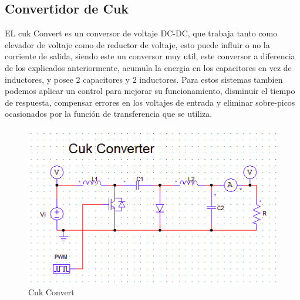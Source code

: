 \documentclass[11pt]{article}
\begin{document}
\subsection{Convertidor de Cuk}
EL cuk Convert es un conversor de voltaje DC-DC, que trabaja tanto como elevador de voltaje como de reductor de voltaje, esto puede influir o no la corriente de salida, siendo este un conversor muy util, este conversor a diferencia de los explicados anteriormente, acumula la energia en los capacitores en vez de inductores, y posee 2 capacitores y 2 inductores. Para estos sistemas tambien podemos aplicar un control para mejorar su funcionamiento, disminuir el tiempo de respuesta, compensar errores en los voltajes de entrada y eliminar sobre-picos ocasionados por la función de transferencia que se utiliza.
\begin{figure}[htp]
\centering
\includegraphics[scale=0.60]{Cuk convert.png}
\caption{Cuk Convert}
\label{}
\end{figure}
\pagebreak
\end{document}
